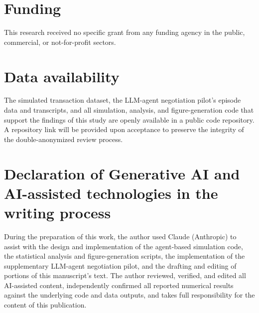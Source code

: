 \documentclass[review]{elsarticle}
\begin{document}
\section*{Funding}
This research received no specific grant from any funding agency in the public, commercial, or not-for-profit sectors.

\section*{Data availability}
The simulated transaction dataset, the LLM-agent negotiation pilot's episode data and transcripts, and all simulation, analysis, and figure-generation code that support the findings of this study are openly available in a public code repository. A repository link will be provided upon acceptance to preserve the integrity of the double-anonymized review process.

\section*{Declaration of Generative AI and AI-assisted technologies in the writing process}
During the preparation of this work, the author used Claude (Anthropic) to assist with the design and implementation of the agent-based simulation code, the statistical analysis and figure-generation scripts, the implementation of the supplementary LLM-agent negotiation pilot, and the drafting and editing of portions of this manuscript's text. The author reviewed, verified, and edited all AI-assisted content, independently confirmed all reported numerical results against the underlying code and data outputs, and takes full responsibility for the content of this publication.


\end{document}
